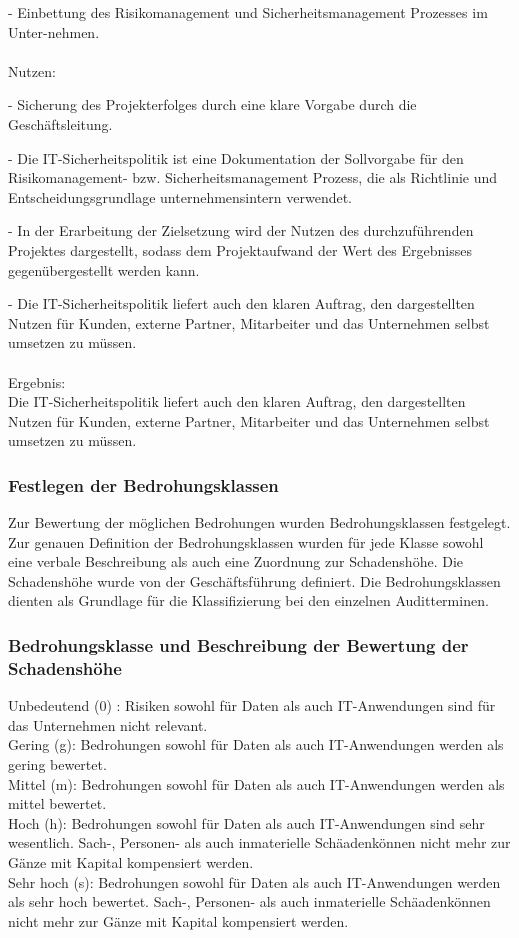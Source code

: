 - Einbettung des Risikomanagement und Sicherheitsmanagement Prozesses im Unter-nehmen.
\\
\\
Nutzen:

- Sicherung des Projekterfolges durch eine klare Vorgabe durch die Geschäftsleitung.

- Die IT-Sicherheitspolitik ist eine Dokumentation der Sollvorgabe für den Risikomanagement- bzw. Sicherheitsmanagement Prozess, die als Richtlinie und Entscheidungsgrundlage unternehmensintern verwendet.

- In der Erarbeitung der Zielsetzung wird der Nutzen des durchzuführenden Projektes dargestellt, sodass dem Projektaufwand der Wert des Ergebnisses gegenübergestellt werden kann.

- Die IT-Sicherheitspolitik liefert auch den klaren Auftrag, den dargestellten Nutzen für Kunden, externe Partner, Mitarbeiter und das Unternehmen selbst umsetzen zu müssen.
\\
\\
Ergebnis:\\
Die IT-Sicherheitspolitik liefert auch den klaren Auftrag, den dargestellten Nutzen für Kunden, externe Partner, Mitarbeiter und das Unternehmen selbst umsetzen zu müssen.

\subsubsection {Festlegen der Bedrohungsklassen}
Zur Bewertung der möglichen Bedrohungen wurden Bedrohungsklassen festgelegt. Zur genauen Definition der Bedrohungsklassen wurden für jede Klasse sowohl eine verbale Beschreibung als auch eine Zuordnung zur Schadenshöhe. Die Schadenshöhe wurde von der Geschäftsführung definiert. Die Bedrohungsklassen dienten als Grundlage für die Klassifizierung bei den einzelnen Auditterminen.
\subsubsection {Bedrohungsklasse und Beschreibung der Bewertung der Schadenshöhe}
Unbedeutend (0) : Risiken sowohl für Daten als auch IT-Anwendungen sind für das Unternehmen nicht relevant.
\\Gering (g): Bedrohungen sowohl für Daten als auch IT-Anwendungen werden als gering bewertet.
\\Mittel (m): Bedrohungen sowohl für Daten als auch IT-Anwendungen werden als mittel bewertet.
\\Hoch (h): Bedrohungen sowohl für Daten als auch IT-Anwendungen sind sehr wesentlich. Sach-, Personen- als auch inmaterielle Schäadenkönnen nicht mehr zur Gänze mit Kapital kompensiert werden.
\\ Sehr hoch (s): Bedrohungen sowohl für Daten als auch IT-Anwendungen werden als sehr hoch bewertet. Sach-, Personen- als auch inmaterielle Schäadenkönnen nicht mehr zur Gänze mit Kapital kompensiert werden.
